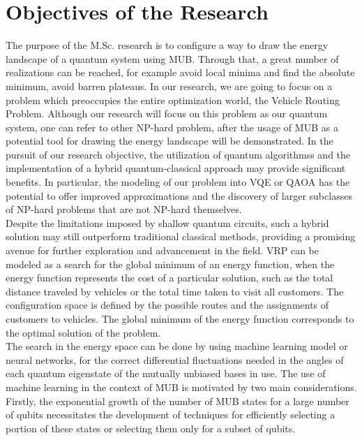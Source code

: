 \documentclass[12pt, a4paper]{article}
\begin{document}
    \section{Objectives of the Research}\label{sec:objectives-of-the-research}
    The purpose of the M.Sc. research is to configure a way to draw the energy landscape of a quantum system using MUB.
    Through that, a great number of realizations can be reached, for example avoid local minima and find the absolute minimum, avoid barren plateaus\@.
    In our research, we are going to focus on a problem which preoccupies the entire optimization world, the Vehicle Routing Problem.
    Although our research will focus on this problem as our quantum system, one can refer to other NP-hard problem, after the usage of MUB as
    a potential tool for drawing the energy landscape will be demonstrated.
    In the pursuit of our research objective, the utilization of quantum algorithmss and the implementation of a hybrid
    quantum-classical approach may provide significant benefits.
    In particular, the modeling of our problem into
    VQE or QAOA has the potential to offer
    improved approximations and the discovery of larger subclasses of NP-hard problems that are not NP-hard themselves.\\
    Despite the limitations imposed by shallow quantum circuits, such a hybrid solution may still outperform traditional
    classical methods, providing a promising avenue for further exploration and advancement in the field.
    VRP can be modeled as a search for the global minimum of an energy function, when the energy function represents
    the cost of a particular solution, such as the total distance traveled by vehicles or the total time taken to visit
    all customers.
    The configuration space is defined by the possible routes and the assignments of customers to vehicles.
    The global minimum of the energy function corresponds to the optimal solution of the problem\@.\\
    The search in the energy space can be done by using machine learning model or neural networks, for the correct differential
    fluctuations needed in the angles of each quantum eigenstate of the mutually unbiased bases in use.
    The use of machine learning in the context of MUB is motivated by two main considerations.
    Firstly, the exponential growth of the number of MUB states for a large number of qubits necessitates the development
    of techniques for efficiently selecting a portion of these states or selecting them only for a subset of qubits.
\end{document}
